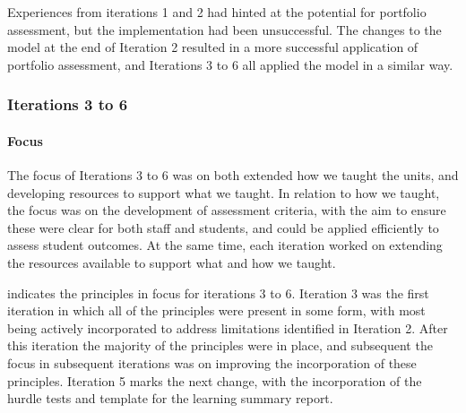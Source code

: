 Experiences from iterations 1 and 2 had hinted at the potential for portfolio assessment, but the implementation had been unsuccessful. The changes to the model at the end of Iteration 2 resulted in a more successful application of portfolio assessment, and Iterations 3 to 6 all applied the model in a similar way. 

\subsubsection{Iterations 3 to 6} %
\label{ssub:iterations_3_to_6}

\paragraph{Focus} %
\label{ssub:focus_3_6}

The focus of Iterations 3 to 6 was on both extended how we taught the units, and developing resources to support what we taught. In relation to how we taught, the focus was on the development of assessment criteria, with the aim to ensure these were clear for both staff and students, and could be applied efficiently to assess student outcomes. At the same time, each iteration worked on extending the resources available to support what and how we taught.

 indicates the principles in focus for iterations 3 to 6. Iteration 3 was the first iteration in which all of the principles were present in some form, with most being actively incorporated to address limitations identified in Iteration 2. After this iteration the majority of the principles were in place, and subsequent the focus in subsequent iterations was on improving the incorporation of these principles. Iteration 5 marks the next change, with the incorporation of the hurdle tests and template for the learning summary report. 

